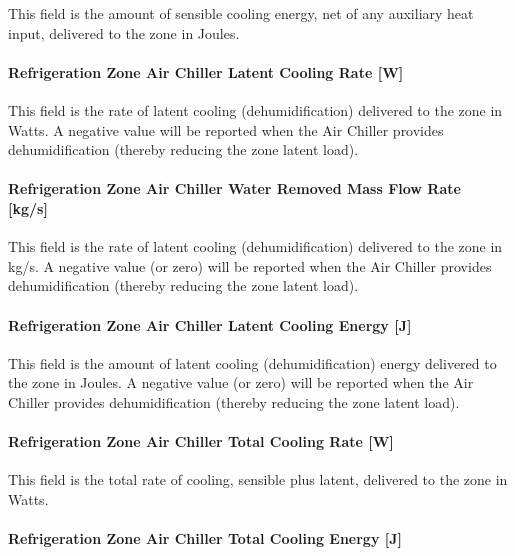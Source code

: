 This field is the amount of sensible cooling energy, net of any auxiliary heat input, delivered to the zone in Joules.

\paragraph{Refrigeration Zone Air Chiller Latent Cooling Rate {[}W{]}}\label{refrigeration-zone-air-chiller-latent-cooling-rate-w-2}

This field is the rate of latent cooling (dehumidification) delivered to the zone in Watts. A negative value will be reported when the Air Chiller provides dehumidification (thereby reducing the zone latent load).

\paragraph{Refrigeration Zone Air Chiller Water Removed Mass Flow Rate~ {[}kg/s{]}}\label{refrigeration-zone-air-chiller-water-removed-mass-flow-rate-kgs-2}

This field is the rate of latent cooling (dehumidification) delivered to the zone in kg/s. A negative value (or zero) will be reported when the Air Chiller provides dehumidification (thereby reducing the zone latent load).

\paragraph{Refrigeration Zone Air Chiller Latent Cooling Energy {[}J{]}}\label{refrigeration-zone-air-chiller-latent-cooling-energy-j-1}

This field is the amount of latent cooling (dehumidification) energy delivered to the zone in Joules. A negative value (or zero) will be reported when the Air Chiller provides dehumidification (thereby reducing the zone latent load).

\paragraph{Refrigeration Zone Air Chiller Total Cooling Rate {[}W{]}}\label{refrigeration-zone-air-chiller-total-cooling-rate-w-2}

This field is the total rate of cooling, sensible plus latent, delivered to the zone in Watts.

\paragraph{Refrigeration Zone Air Chiller Total Cooling Energy {[}J{]}}\label{refrigeration-zone-air-chiller-total-cooling-energy-j-1}

